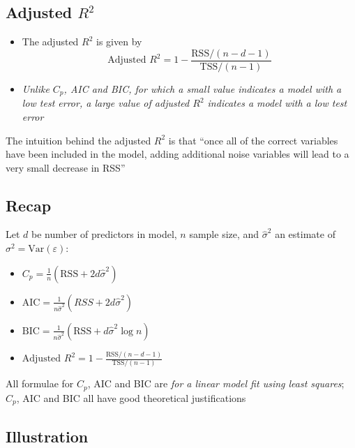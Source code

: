 \documentclass[]{article}
\providecommand{\tightlist}{%
  \setlength{\itemsep}{0pt}\setlength{\parskip}{0pt}}
\begin{document}
\subsection{\texorpdfstring{Adjusted
\(R^{2}\)}{Adjusted R\^{}\{2\}}}\label{adjusted-r2}

\begin{itemize}
\tightlist
\item
  The adjusted \(R^{2}\) is given by \[
  \text{Adjusted }R^{2}=1-\frac{\textrm{RSS}/\left(  n-d-1\right)  }{\textrm{TSS}/\left(n-1\right)  }
  \]
\item
  \emph{Unlike \(C_{p}\), AIC and BIC, for which a small value indicates
  a model with a low test error, a large value of adjusted \(R^{2}\)
  indicates a model with a low test error}
\end{itemize}

The intuition behind the adjusted \(R^{2}\) is that ``once all of the
correct variables have been included in the model, adding additional
noise variables will lead to a very small decrease in RSS''

\subsection{Recap}\label{recap}

Let \(d\) be number of predictors in model, \(n\) sample size, and
\(\hat{\sigma}^{2}\) an estimate of
\(\sigma^2=\textrm{Var}(\varepsilon)\):

\begin{itemize}
\item
  \(C_{p}=\frac{1}{n}\left( \textrm{RSS}+2d\hat{\sigma}^{2}\right)\)
\item
  \(\textrm{AIC}=\frac{1}{n\hat{\sigma}^{2}}\left( RSS+2d\hat{\sigma}^{2}\right)\)
\item
  \(\textrm{BIC}=\frac{1}{n\hat{\sigma}^{2}}\left( \textrm{RSS}+d\hat{\sigma}^{2}\log n\right)\)
\item
  \(\text{Adjusted }R^{2}=1-\frac{\textrm{RSS}/\left( n-d-1\right) }{\textrm{TSS}/\left(n-1\right) }\)
\end{itemize}

All formulae for \(C_{p}\), AIC and BIC are \emph{for a linear model fit
using least squares}; \(C_p\), AIC and BIC all have good theoretical
justifications

\subsection{Illustration}\label{illustration-3}
\end{document}
